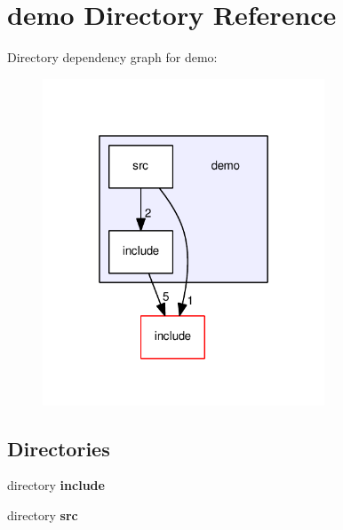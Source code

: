 \section{demo Directory Reference}
\label{dir_b6c2a257bfab6380ca9b3cb94b12cb25}
Directory dependency graph for demo\+:
\nopagebreak
\begin{figure}[H]
\begin{center}
\leavevmode
\includegraphics[width=238pt]{dir_b6c2a257bfab6380ca9b3cb94b12cb25_dep}
\end{center}
\end{figure}
\subsection*{Directories}
\begin{DoxyCompactItemize}
\item 
directory {\bf include}
\item 
directory {\bf src}
\end{DoxyCompactItemize}
